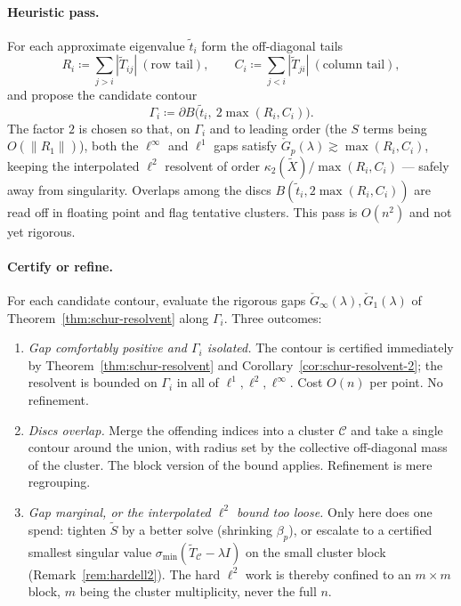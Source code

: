 \documentclass[11pt, a4paper]{article}
\numberwithin{equation}{section}
\newcommand{\norm}[1]{\left\|#1\right\|}
\newcommand{\abs}[1]{\left|#1\right|}
\newcommand{\tX}{\widetilde{X}}
\newcommand{\tT}{\widetilde{T}}
\begin{document}
\paragraph{Heuristic pass.}
For each approximate eigenvalue $\tilde t_i$ form the off-diagonal tails
\[
  R_i \coloneqq \sum_{j>i}\abs{\tT_{ij}} \ (\text{row tail}), \qquad
  C_i \coloneqq \sum_{j<i}\abs{\tT_{ji}} \ (\text{column tail}),
\]
and propose the candidate contour
\[
  \Gamma_i \coloneqq \partial B\bigl(\tilde t_i,\ 2\max(R_i, C_i)\bigr).
\]
The factor $2$ is chosen so that, on $\Gamma_i$ and to leading order (the $S$
terms being $O(\norm{R_1})$), both the $\ell^\infty$ and $\ell^1$ gaps satisfy
$\check G_p(\lambda) \gtrsim \max(R_i, C_i)$, keeping the interpolated $\ell^2$
resolvent of order $\kappa_2(\tX)/\max(R_i,C_i)$ --- safely away from
singularity.  Overlaps among the discs $B(\tilde t_i, 2\max(R_i,C_i))$ are read
off in floating point and flag tentative clusters.  This pass is $O(n^2)$ and
not yet rigorous.

\paragraph{Certify or refine.}
For each candidate contour, evaluate the rigorous gaps $\check G_\infty(\lambda),
\check G_1(\lambda)$ of Theorem~\ref{thm:schur-resolvent} along $\Gamma_i$.  Three
outcomes:
\begin{enumerate}
  \item \emph{Gap comfortably positive and $\Gamma_i$ isolated.} The contour is
    certified immediately by Theorem~\ref{thm:schur-resolvent} and
    Corollary~\ref{cor:schur-resolvent-2}; the resolvent is bounded on $\Gamma_i$
    in all of $\ell^1, \ell^2, \ell^\infty$.  Cost $O(n)$ per point.  No
    refinement.
  \item \emph{Discs overlap.} Merge the offending indices into a cluster
    $\mathcal{C}$ and take a single contour around the union, with radius set by
    the collective off-diagonal mass of the cluster.  The block version of the
    bound applies.  Refinement is mere regrouping.
  \item \emph{Gap marginal, or the interpolated $\ell^2$ bound too loose.} Only
    here does one spend: tighten $\tilde S$ by a better solve (shrinking
    $\beta_p$), or escalate to a certified smallest singular value
    $\sigma_{\min}(\tT_{\mathcal{C}} - \lambda I)$ on the small cluster block
    (Remark~\ref{rem:hardell2}).  The hard $\ell^2$ work is thereby confined to
    an $m\times m$ block, $m$ being the cluster multiplicity, never the full $n$.
\end{enumerate}
\end{document}
